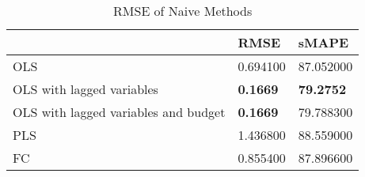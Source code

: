 \begin{table}[h!]
\centering
\caption{RMSE of Naive Methods}
\label{naive_rmse}
\begin{tabular}{lll}
\toprule
 & RMSE & sMAPE \\
\midrule
OLS & 0.694100 & 87.052000 \\
OLS with lagged variables & \textbf{0.1669} & \textbf{79.2752} \\
OLS with lagged variables and budget & \textbf{0.1669} & 79.788300 \\
PLS & 1.436800 & 88.559000 \\
FC & 0.855400 & 87.896600 \\
\bottomrule
\end{tabular}
\end{table}
